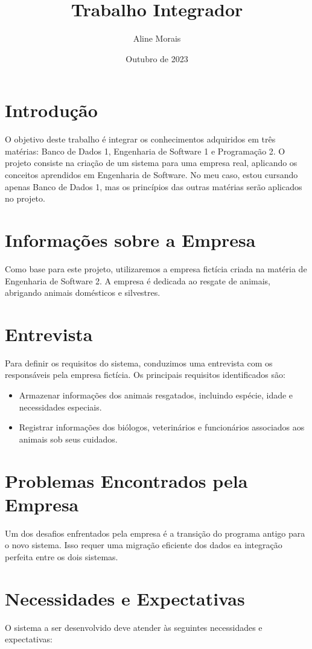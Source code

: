 \documentclass{article}
\title{Trabalho Integrador}
\author{Aline Morais}
\date{Outubro de 2023}
\begin{document}
\maketitle

\section{Introdução}
O objetivo deste trabalho é integrar os conhecimentos adquiridos em três matérias: Banco de Dados 1, Engenharia de Software 1 e Programação 2. O projeto consiste na criação de um sistema para uma empresa real, aplicando os conceitos aprendidos em Engenharia de Software. No meu caso, estou cursando apenas Banco de Dados 1, mas os princípios das outras matérias serão aplicados no projeto.

\section{Informações sobre a Empresa}
Como base para este projeto, utilizaremos a empresa fictícia criada na matéria de Engenharia de Software 2. A empresa é dedicada ao resgate de animais, abrigando animais domésticos e silvestres.

\section{Entrevista}
Para definir os requisitos do sistema, conduzimos uma entrevista com os responsáveis pela empresa fictícia. Os principais requisitos identificados são:

\begin{itemize}
    \item Armazenar informações dos animais resgatados, incluindo espécie, idade e necessidades especiais.
    \item Registrar informações dos biólogos, veterinários e funcionários associados aos animais sob seus cuidados.
\end{itemize}

\section{Problemas Encontrados pela Empresa}
Um dos desafios enfrentados pela empresa é a transição do programa antigo para o novo sistema. Isso requer uma migração eficiente dos dados ea integração perfeita entre os dois sistemas.

\section{Necessidades e Expectativas}
O sistema a ser desenvolvido deve atender às seguintes necessidades e expectativas:
\end{document}
